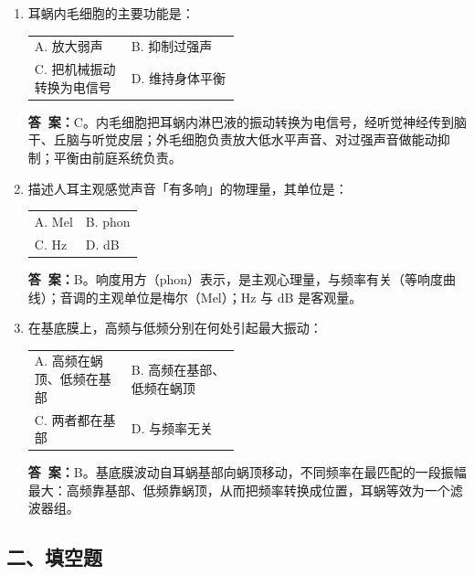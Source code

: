 \documentclass[10.5pt]{ctexart}
\makeatletter
\newenvironment{qlist}
  {\begin{enumerate}[label={\sffamily\bfseries\color{accent}\arabic*.},leftmargin=2.4em,labelsep=0.55em,itemsep=0.62em,topsep=0.15em,parsep=0.3em,partopsep=0pt]}
  {\end{enumerate}}
\newcommand{\optlisttwo}[4]{%
  \par\vspace{0.34em}%
  {\small\color{optink}%
  \noindent\begin{tabularx}{\dimexpr\linewidth-0.2em\relax}{@{}>{\raggedright\arraybackslash}p{0.47\linewidth}@{\hspace{0.9em}}>{\raggedright\arraybackslash}X@{}}
  #1 & #2\\[0.28em] #3 & #4
  \end{tabularx}}}
\newcommand{\anslabel}{{\sffamily\bfseries\color{accent}答\ 案：}\hspace{0.35em}}
\newcommand{\ans}[1]{\par\vspace{2.15\baselineskip}\begin{ansbox}\anslabel #1\end{ansbox}}
\makeatother
\begin{document}
\begin{qlist}
\item 耳蜗内毛细胞的主要功能是：
\optlisttwo{A. 放大弱声}{B. 抑制过强声}{C. 把机械振动转换为电信号}{D. 维持身体平衡}
\ans{C。内毛细胞把耳蜗内淋巴液的振动转换为电信号，经听觉神经传到脑干、丘脑与听觉皮层；外毛细胞负责放大低水平声音、对过强声音做能动抑制；平衡由前庭系统负责。}

\item 描述人耳主观感觉声音「有多响」的物理量，其单位是：
\optlisttwo{A. Mel}{B. phon}{C. Hz}{D. dB}
\ans{B。响度用方（phon）表示，是主观心理量，与频率有关（等响度曲线）；音调的主观单位是梅尔（Mel）；Hz 与 dB 是客观量。}

\item 在基底膜上，高频与低频分别在何处引起最大振动：
\optlisttwo{A. 高频在蜗顶、低频在基部}{B. 高频在基部、低频在蜗顶}{C. 两者都在基部}{D. 与频率无关}
\ans{B。基底膜波动自耳蜗基部向蜗顶移动，不同频率在最匹配的一段振幅最大：高频靠基部、低频靠蜗顶，从而把频率转换成位置，耳蜗等效为一个滤波器组。}

\end{qlist}

\subsection{二、填空题}
\end{document}
